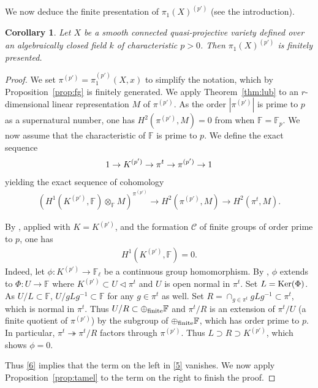 \documentclass[12pt]{amsart}
\theoremstyle{plain}
\newtheorem{cor}[thm]{Corollary}
\theoremstyle{definition}
\numberwithin{thm}{section}
\newcommand{\ga}[2]{\begin{gather}\label{#1}#2 \end{gather}}
\newcommand{\F}{{\mathbb F}}
\numberwithin{equation}{section}
\begin{document}
We now deduce the finite presentation of $\pi_1(X)^{(p')}$ (see the introduction). 
\begin{cor} \label{cor:primetop}
Let $X$ be a smooth connected quasi-projective variety defined over an algebraically closed field $k$ of characteristic $p>0$.  Then  $\pi_1(X)^{(p')}$ is finitely presented.

\end{cor}
\begin{proof}
We  set $\pi^{(p')}=\pi_1^{(p')}(X,x)$ to simplify the notation, which by Proposition~\ref{prop:fg} is finitely generated. We  apply Theorem~\ref{thm:lub} to   an $r$-dimensional linear representation $M$ of  $\pi^{(p')}$. 
As the order $|\pi^{(p')}|$ is prime to $p$ as a supernatural number,  one has $H^2(\pi^{(p')}, M)=0$ 
from \cite[\S3. Proposition~11,~Corollary 2]{Ser97}  when $\F=\F_p$.  We now assume that the characteristic of $\F$ is prime to $p$. We define the exact sequence
\ga{}{1\to K^{(p')}\to \pi^t\to \pi^{(p')}\to 1 \notag}
yielding the exact sequence of cohomology
\ga{5}{ (H^1(K^{(p')}, \F)\otimes_{\F} M)^{\pi^{(p')}} \to H^2(\pi^{(p')},  M) \to H^2(\pi^t, M).} 

By \cite[Lemma~3.4.1(d)]{RZ10}, applied with $K=K^{(p')}$, and the formation $\mathcal{C}$ of finite groups of order prime to $p$, one has 
\ga{6}{ H^1(K^{(p')}, \F)=0.}
Indeed, let $\phi \colon K^{(p')} \to \F_\ell$ be a continuous group homomorphism.
By \cite[ Lemma~1.2.5(c)]{FJ08}, $\phi$ extends to $\Phi: U\to \F$ where 
   $ K^{(p')} \subset U \lhd \pi^t$ and $U$ is open normal  in $\pi^t$. Set $L={\rm Ker} ( \Phi) $. 
   As $U/L \subset \F$, $U/gLg^{-1} \subset \F$  for any $ g\in \pi^t$ as well.  Set $R=\cap_{g\in \pi^t} gLg^{-1}\subset \pi^t$, which is normal in $\pi^t$. Thus
   $U/R \subset \oplus_{\rm finite} \F$  and $\pi^t/R$ is an extension of $\pi^t/U$ (a finite quotient of $\pi^{(p')}$)  by the subgroup of  $\oplus_{\rm finite} \F$, which has order prime to $p$.  In particular, $\pi^t\twoheadrightarrow\pi^t/R$ factors through $\pi^{(p')}$. Thus $L\supset R\supset K^{(p')}$, which shows $\phi=0$. 
   
   Thus \eqref{6} implies that the  term  on the left in \eqref{5} vanishes. We now apply 
   Proposition~\ref{prop:tamel} to the term on the right to finish the proof. 
   
  
\end{proof}
\end{document}
